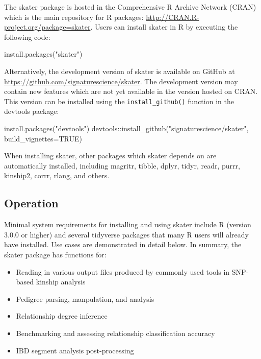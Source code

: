 \documentclass[9pt,a4paper,]{extarticle}
\newenvironment{Shaded}{\begin{snugshade}}{\end{snugshade}}
\newcommand{\AttributeTok}[1]{\textcolor[rgb]{0.77,0.63,0.00}{#1}}
\newcommand{\ConstantTok}[1]{\textcolor[rgb]{0.00,0.00,0.00}{#1}}
\newcommand{\FunctionTok}[1]{\textcolor[rgb]{0.00,0.00,0.00}{#1}}
\newcommand{\NormalTok}[1]{#1}
\newcommand{\SpecialCharTok}[1]{\textcolor[rgb]{0.00,0.00,0.00}{#1}}
\newcommand{\StringTok}[1]{\textcolor[rgb]{0.31,0.60,0.02}{#1}}
\begin{document}
The skater package is hosted in the Comprehensive R Archive Network (CRAN) which is the main repository for R packages: \url{http://CRAN.R-project.org/package=skater}. Users can install skater in R by executing the following code:

\begin{Shaded}
\begin{Highlighting}[]
\FunctionTok{install.packages}\NormalTok{(}\StringTok{"skater"}\NormalTok{)}
\end{Highlighting}
\end{Shaded}

Alternatively, the development version of skater is available on GitHub at \url{https://github.com/signaturescience/skater}. The development version may contain new features which are not yet available in the version hosted on CRAN. This version can be installed using the \texttt{install\_github()} function in the devtools package:

\begin{Shaded}
\begin{Highlighting}[]
\FunctionTok{install.packages}\NormalTok{(}\StringTok{"devtools"}\NormalTok{)}
\NormalTok{devtools}\SpecialCharTok{::}\FunctionTok{install\_github}\NormalTok{(}\StringTok{"signaturescience/skater"}\NormalTok{, }\AttributeTok{build\_vignettes=}\ConstantTok{TRUE}\NormalTok{)}
\end{Highlighting}
\end{Shaded}

When installing skater, other packages which skater depends on are automatically installed, including magritr, tibble, dplyr, tidyr, readr, purrr, kinship2, corrr, rlang, and others.

\hypertarget{operation}{%
\subsection{Operation}\label{operation}}

Minimal system requirements for installing and using skater include R (version 3.0.0 or higher) and several tidyverse packages \citep{Wickham2019} that many R users will already have installed. Use cases are demonstrated in detail below. In summary, the skater package has functions for:

\begin{itemize}
\item
  Reading in various output files produced by commonly used tools in SNP-based kinship analysis
\item
  Pedigree parsing, manpulation, and analysis
\item
  Relationship degree inference
\item
  Benchmarking and assessing relationship classification accuracy
\item
  IBD segment analysis post-processing
\end{itemize}
\end{document}

